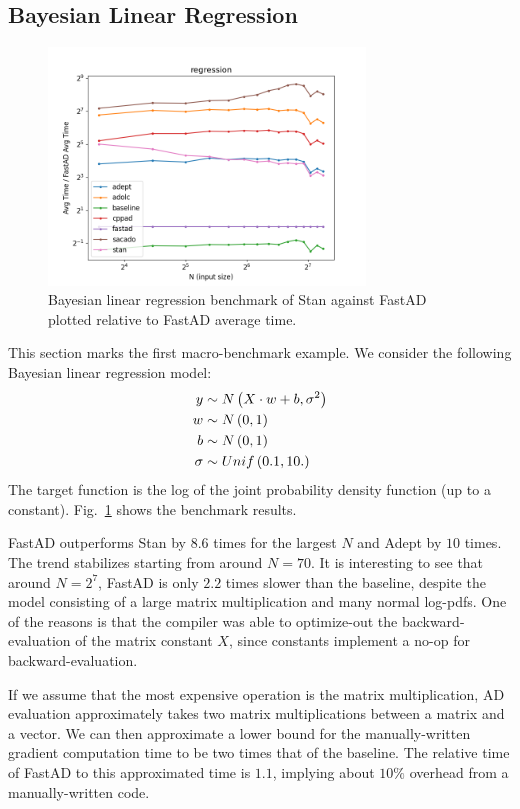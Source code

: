 \subsection{Bayesian Linear Regression}\label{ssec:regression}

\begin{figure}[t]
    \centering
    \includegraphics[width=0.75\textwidth]{figs/regression_fig.png}
    \caption{%
        Bayesian linear regression benchmark of Stan against FastAD 
        plotted relative to FastAD average time.
    }\label{fig:regression}
\end{figure}

This section marks the first macro-benchmark example.
We consider the following Bayesian linear regression model:
\begin{align*}
    y &\sim N\left(X\cdot w + b, \sigma^2\right) \\
    w &\sim N\left(0,1\right) \\
    b &\sim N\left(0,1\right) \\
    \sigma &\sim Unif\left(0.1, 10.\right)
\end{align*}
The target function is the log of the joint probability density function (up to a constant).
Fig.~\ref{fig:regression} shows the benchmark results.

FastAD outperforms Stan by $ 8.6$ times for the largest $N$ and Adept by $ 10$ times.
The trend stabilizes starting from around $N=70$.
It is interesting to see that around $N=2^7$, 
FastAD is only $ 2.2$ times slower than the baseline,
despite the model consisting of a large matrix multiplication and many normal log-pdfs.
One of the reasons is that the compiler was able to optimize-out the backward-evaluation 
of the matrix constant $X$, since constants implement a no-op for backward-evaluation.

If we assume that the most expensive operation is the matrix multiplication,
AD evaluation approximately takes two matrix multiplications between a matrix and a vector.
We can then approximate a lower bound for the manually-written gradient computation time to be two times that of the baseline.
The relative time of FastAD to this approximated time is
$1.1$, implying about $ 10\%$ overhead from a manually-written code.
